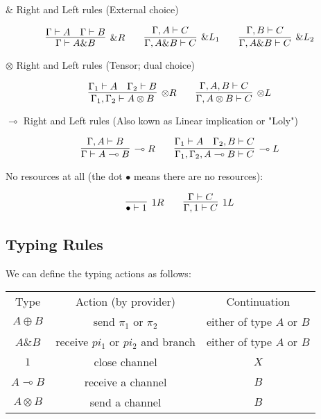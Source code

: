 \documentclass{article}
\begin{document}
	$\&$ Right and Left rules (External choice)

	\[
	\infer[\&\scriptsize{R}]
	{\Gamma \vdash A \& B}{\Gamma \vdash A \hspace{1em} \Gamma \vdash B}
	\qquad
	\infer[\&\scriptsize{L_1}]
	{\Gamma, A \& B \vdash C}{\Gamma, A \vdash C}
	\qquad
	\infer[\&\scriptsize{L_2}]
	{\Gamma, A \& B \vdash C}{\Gamma, B \vdash C}
	\]


	$\otimes$ Right and Left rules (Tensor; dual choice)

	\[
	\infer[\otimes\scriptsize{R}]
	{\Gamma_{1}, \Gamma_{2} \vdash A \otimes B}{\Gamma_{1} \vdash A \hspace{1em} \Gamma_{2} \vdash B}
	\qquad
	\infer[\otimes\scriptsize{L}]
	{\Gamma , A \otimes B \vdash C}{\Gamma, A, B \vdash C}
	\]

	$\multimap$ Right and Left rules (Also kown as Linear implication or "Loly")

	\[
	\infer[\multimap\scriptsize{R}]
	{\Gamma \vdash A \multimap B}{\Gamma, A \vdash B}
	\qquad
	\infer[\multimap\scriptsize{L}]
	{\Gamma_{1}, \Gamma_{2}, A \multimap B \vdash C}{\Gamma_{1} \vdash A \hspace{1em} \Gamma_{2}, B \vdash C}
	\]

	No resources at all (the dot $ \bullet $ means there are no resources):

	\[
	\infer[\scriptsize{1R}]
	{\bullet \vdash 1}{}
	\qquad
	\infer[\scriptsize{1L}]
	{\Gamma, 1 \vdash C}{\Gamma \vdash C}
	\]


	\subsection{Typing Rules}
	
	We can define the typing actions as follows:\\
	
\begin{tabular}{ccc}
    Type & Action (by provider) & Continuation \\
    \(A \oplus B\) & send \(\pi_1\) or \(\pi_2\) & either of type \(A\) or \(B\)\\
    \(A \& B\) & receive \(pi_1\) or \(pi_2\) and branch  &  either of type \(A\) or \(B\)\\
    \(1\) & close channel &\(X\) \\
    \(A \multimap B\) & receive a channel &\(B\) \\
    \(A \otimes B\) & send a channel &\(B\) \\
\end{tabular}
\\
\end{document}
